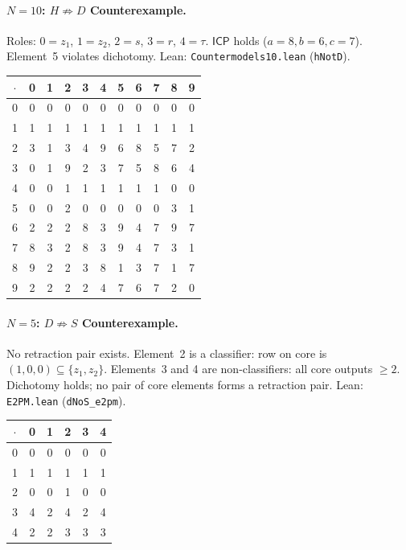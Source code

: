 \documentclass[sigconf,screen,review,anonymous]{acmart}
\newcommand{\dotop}{\cdot}
\newcommand{\ICP}{\textsf{ICP}}
\begin{document}
\paragraph{$N\!=\!10$: $H \not\Rightarrow D$ Counterexample.}
Roles: $0 = z_1$, $1 = z_2$, $2 = s$, $3 = r$, $4 = \tau$. $\ICP$ holds ($a\!=\!8, b\!=\!6, c\!=\!7$). Element~5 violates dichotomy. \quad Lean: \texttt{Countermodels10.lean} (\texttt{hNotD}).

\medskip
{\footnotesize
\begin{tabular}{c|cccccccccc}
$\dotop$ & 0 & 1 & 2 & 3 & 4 & 5 & 6 & 7 & 8 & 9 \\\hline
0 & 0 & 0 & 0 & 0 & 0 & 0 & 0 & 0 & 0 & 0 \\
1 & 1 & 1 & 1 & 1 & 1 & 1 & 1 & 1 & 1 & 1 \\
2 & 3 & 1 & 3 & 4 & 9 & 6 & 8 & 5 & 7 & 2 \\
3 & 0 & 1 & 9 & 2 & 3 & 7 & 5 & 8 & 6 & 4 \\
4 & 0 & 0 & 1 & 1 & 1 & 1 & 1 & 1 & 0 & 0 \\
5 & 0 & 0 & 2 & 0 & 0 & 0 & 0 & 0 & 3 & 1 \\
6 & 2 & 2 & 2 & 8 & 3 & 9 & 4 & 7 & 9 & 7 \\
7 & 8 & 3 & 2 & 8 & 3 & 9 & 4 & 7 & 3 & 1 \\
8 & 9 & 2 & 2 & 3 & 8 & 1 & 3 & 7 & 1 & 7 \\
9 & 2 & 2 & 2 & 2 & 4 & 7 & 6 & 7 & 2 & 0 \\
\end{tabular}}

\paragraph{$N\!=\!5$: $D \not\Rightarrow S$ Counterexample.}
No retraction pair exists. Element~2 is a classifier: row on core is $(1,0,0) \subseteq \{z_1, z_2\}$. Elements~3 and 4 are non-classifiers: all core outputs $\geq 2$. Dichotomy holds; no pair of core elements forms a retraction pair. \quad Lean: \texttt{E2PM.lean} (\texttt{dNoS\_e2pm}).

\medskip
{\small
\begin{tabular}{c|ccccc}
$\dotop$ & 0 & 1 & 2 & 3 & 4 \\\hline
0 & 0 & 0 & 0 & 0 & 0 \\
1 & 1 & 1 & 1 & 1 & 1 \\
2 & 0 & 0 & 1 & 0 & 0 \\
3 & 4 & 2 & 4 & 2 & 4 \\
4 & 2 & 2 & 3 & 3 & 3 \\
\end{tabular}}
\end{document}
